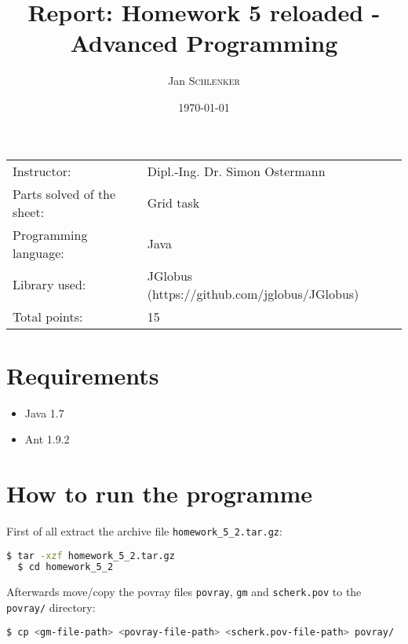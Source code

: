 \documentclass{article}
\title{Report: Homework 5 reloaded - Advanced Programming}%
\author{Jan \textsc{Schlenker}} %
\date{\today} %
\begin{document}
\maketitle %

\begin{center}
\begin{tabular}{l l}
Instructor: & Dipl.-Ing. Dr. Simon Ostermann \\
Parts solved of the sheet: & Grid task \\
Programming language: & Java \\
Library used: & JGlobus (https://github.com/jglobus/JGlobus) \\
Total points: & 15 \\
\end{tabular}
\end{center}


\section{Requirements}

\begin{itemize}
\item Java 1.7
\item Ant 1.9.2
\end{itemize}

\section{How to run the programme}

First of all extract the archive file \texttt{homework\_5\_2.tar.gz}:

\begin{lstlisting}[language=bash, deletekeywords={cd}]
  $ tar -xzf homework_5_2.tar.gz
  $ cd homework_5_2
\end{lstlisting}

Afterwards move/copy the povray files \texttt{povray}, \texttt{gm} and \texttt{scherk.pov} to the \texttt{povray/} directory:

\begin{lstlisting}[language=bash]
  $ cp <gm-file-path> <povray-file-path> <scherk.pov-file-path> povray/
\end{lstlisting}
\end{document}
